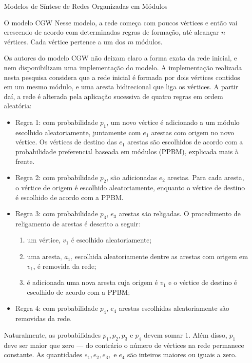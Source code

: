 \begin{section}{Modelos de Síntese de Redes Organizadas em Módulos}
\begin{subsection}{O modelo CGW}
Nesse modelo, a rede começa com poucos vértices e então vai crescendo de acordo com determinadas regras de formação, até alcançar $n$ vértices. Cada vértice pertence a um dos $m$ módulos.

Os autores do modelo CGW não deixam claro a forma exata da rede inicial, e nem disponibilizam uma implementação do modelo. A implementação realizada nesta pesquisa considera que a rede inicial é formada por dois vértices contidos em um mesmo módulo, e uma aresta bidirecional que liga os vértices. A partir daí, a rede é alterada pela aplicação sucessiva de quatro regras em ordem aleatória:

\begin{itemize}
	
	\item Regra 1: com probabilidade $p_1$, um novo vértice é adicionado a um módulo escolhido aleatoriamente, juntamente com $e_1$ arestas com origem no novo vértice. Os vértices de destino das $e_1$ arestas são escolhidos de acordo com a probabilidade preferencial baseada em módulos (PPBM), explicada mais à frente.
	
	\item Regra 2: com probabilidade $p_2$, são adicionadas $e_2$ arestas. Para cada aresta, o vértice de origem é escolhido aleatoriamente, enquanto o vértice de destino é escolhido de acordo com a PPBM.
	
	\item Regra 3: com probabilidade $p_3$, $e_3$ arestas são religadas. O procedimento de religamento de arestas é descrito a seguir:
	
	\begin{enumerate}
		\item um vértice, $v_1$ é escolhido aleatoriamente;
		\item uma aresta, $a_1$, escolhida aleatoriamente dentre as arestas com origem em $v_1$, é removida da rede;
		\item é adicionada uma nova aresta cuja origem é $v_1$ e o vértice de destino é escolhido de acordo com a PPBM;
	\end{enumerate}
	
	\item Regra 4: com probabilidade $p_4$, $e_4$ arestas escolhidas aleatoriamente são removidas da rede.
	
\end{itemize}

Naturalmente, as probabilidades $p_1, p_2, p_3$ e $p_4$ devem somar 1. Além disso, $p_1$ deve ser maior que zero --- do contrário o número de vértices na rede permanece constante. As quantidades $e_1, e_2, e_3, $ e $e_4$ são inteiros maiores ou iguais a zero.


\end{subsection}
\end{section}
